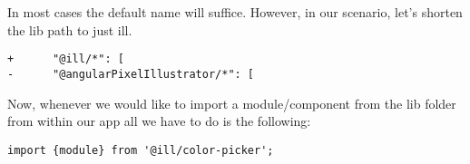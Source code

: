 In most cases the default name will suffice. However, in our scenario, let's
shorten the lib path to just ill.

\begin{lstlisting}
+      "@ill/*": [
-      "@angularPixelIllustrator/*": [
\end{lstlisting}

Now, whenever we would like to import a module/component from the lib folder
from within our app all we have to do is the following:
\begin{lstlisting}
import {module} from '@ill/color-picker';
\end{lstlisting}

